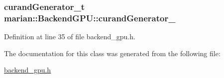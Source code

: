 \subsubsection[{\texorpdfstring{curand\+Generator\+\_\+}{curandGenerator_}}]{\setlength{\rightskip}{0pt plus 5cm}curand\+Generator\+\_\+t marian\+::\+Backend\+G\+P\+U\+::curand\+Generator\+\_\+\hspace{0.3cm}{\ttfamily [private]}}\hypertarget{classmarian_1_1BackendGPU_a9988ccab12ceb4e0dc920c12394484e6}{}\label{classmarian_1_1BackendGPU_a9988ccab12ceb4e0dc920c12394484e6}


Definition at line 35 of file backend\+\_\+gpu.\+h.



The documentation for this class was generated from the following file\+:\begin{DoxyCompactItemize}
\item 
\hyperlink{backend__gpu_8h}{backend\+\_\+gpu.\+h}\end{DoxyCompactItemize}
